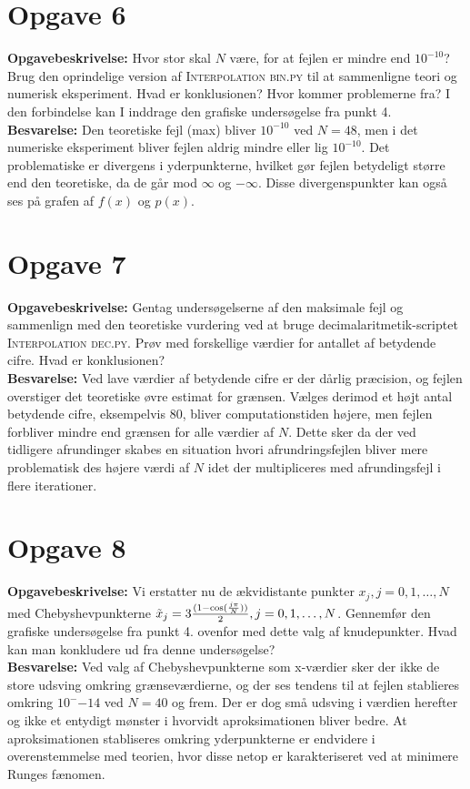 \section*{Opgave 6}
\textbf{Opgavebeskrivelse:} Hvor stor skal $N$ være, for at fejlen er mindre end $10^{-10}$? 
Brug den oprindelige version af \textsc{Interpolation bin.py} til at sammenligne teori og numerisk eksperiment. 
Hvad er konklusionen? 
Hvor kommer problemerne fra? 
I den forbindelse kan I inddrage den grafiske undersøgelse fra punkt 4.
\\
\textbf{Besvarelse:} Den teoretiske fejl (max) bliver $10^{-10}$ ved $N=48$, men i det numeriske eksperiment bliver fejlen aldrig mindre eller lig $10^{-10}$. Det problematiske er divergens i yderpunkterne, hvilket gør fejlen betydeligt større end den teoretiske, da de går mod $ \infty $ og $ - \infty $. Disse divergenspunkter kan også ses på grafen af $f(x)$ og $p(x)$. 
\section*{Opgave 7}
\textbf{Opgavebeskrivelse:} Gentag undersøgelserne af den maksimale fejl og sammenlign med den teoretiske vurdering ved at bruge decimalaritmetik-scriptet \textsc{Interpolation dec.py}. 
Prøv med forskellige værdier for antallet af betydende cifre. 
Hvad er konklusionen?
\\
\textbf{Besvarelse:} 
Ved lave værdier af betydende cifre er der dårlig præcision, og fejlen overstiger det teoretiske øvre estimat for grænsen. Vælges derimod et højt antal betydende cifre, eksempelvis $80$, bliver computationstiden højere, men fejlen forbliver mindre end grænsen for alle værdier af $N$.
Dette sker da der ved tidligere afrundinger skabes en situation hvori afrundringsfejlen bliver mere problematisk des højere værdi af $N$ idet der multipliceres med afrundingsfejl i flere iterationer.
\section*{Opgave 8}
\textbf{Opgavebeskrivelse:} Vi erstatter nu de ækvidistante punkter $x_j , j = 0, 1, \ldots , N$ med Chebyshevpunkterne $\Tilde{x}_j = 3 \frac{(1 -\cos(\frac{j \pi}{N}))}{2}, j = 0, 1, \ldots , N$. 
Gennemfør den grafiske undersøgelse fra punkt 4. ovenfor med dette valg af knudepunkter. 
Hvad kan man konkludere ud fra denne undersøgelse?
\\
\textbf{Besvarelse:} 
Ved valg af Chebyshevpunkterne som x-værdier sker der ikke de store udsving omkring grænseværdierne, og der ses tendens til at fejlen stablieres omkring $10^-{-14}$ ved $N=40$ og frem. Der er dog små udsving i værdien herefter og ikke et entydigt mønster i hvorvidt aproksimationen bliver bedre.
At aproksimationen stabliseres omkring yderpunkterne er endvidere i overenstemmelse med teorien, hvor disse netop er karakteriseret ved at minimere Runges fænomen.
